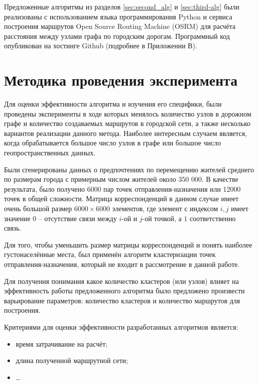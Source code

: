 Предложенные алгоритмы из разделов \ref{sec:second_alg} и \ref{sec:third-alg} были реализованы с 
использованием языка программирования Python и сервиса построения маршрутов Open Source Routing Machine 
(OSRM) для расчёта расстояния между узлами графа по городским дорогам. Программный код опубликован на 
хостинге Github (подробнее в Приложении В).

\section{Методика проведения эксперимента}
Для оценки эффективности алгоритма и изучения его специфики, были проведены эксперименты в ходе которых 
менялось количество узлов в дорожном графе и количество создаваемых маршрутов в городской сети, а также 
несколько вариантов реализации данного метода. Наиболее интересным случаем является, когда обрабатывается 
большое число узлов в графе или большое число геопространственных данных.

Были сгенерированы данных о предпочтениях по перемещению жителей среднего по размерам города с примерным 
числом жителей около 350 000. В качестве результата, было получено 6000 пар точек отправления-назначения или 
12000 точек в общей сложности. Матрица корреспонденций в данном случае имеет очень большой размер 
\( 6000 \times 6000 \) элементов, где элемент с индексом \( i, j \) имеет значение \( 0 \) -- отсутствие связи 
между \( i \)-ой и \( j \)-ой точкой, а \( 1 \) соответственно связь.

Для того, чтобы уменьшить размер матрицы корреспонденций и понять наиболее густонаселённые места, был 
применён алгоритм кластеризации точек отправления-назначения, который не входит в рассмотрение в данной 
работе.

Для получения понимания какое количество кластеров (или узлов) влияет на эффективность работы предложенного 
алгоритма было предложено произвести варьирование параметров: количество кластеров и количество маршрутов для 
построения.

Критериями для оценки эффективности разработанных алгоритмов является:
\begin{itemize}
    \item время затрачивание на расчёт;
    \item длина полученной маршрутной сети;
    \item \ldots
\end{itemize}

